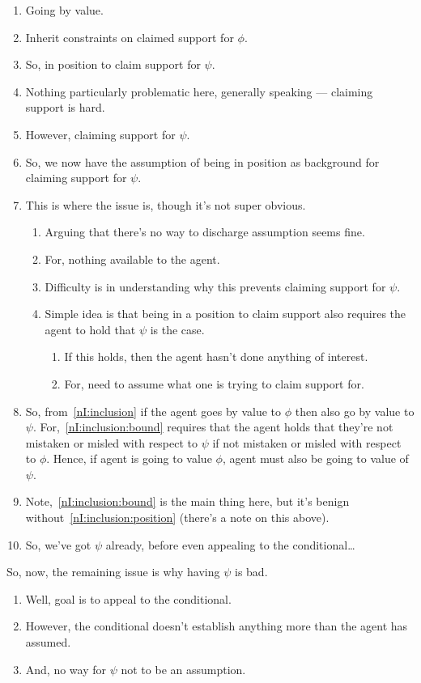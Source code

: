 \begin{note}[Revised]
  \begin{enumerate}
  \item Going by value.
  \item Inherit constraints on claimed support for \(\phi\).
  \item So, in position to claim support for \(\psi\).
  \item Nothing particularly problematic here, generally speaking --- claiming support is hard.
  \item However, claiming support for \(\psi\).
  \item So, we now have the assumption of being in position as background for claiming support for \(\psi\).
  \item This is where the issue is, though it's not super obvious.
    \begin{enumerate}
    \item Arguing that there's no way to discharge assumption seems fine.
    \item For, nothing available to the agent.
    \item Difficulty is in understanding why this prevents claiming support for \(\psi\).
    \item Simple idea is that being in a position to claim support also requires the agent to hold that \(\psi\) is the case.
      \begin{enumerate}
      \item If this holds, then the agent hasn't done anything of interest.
      \item For, need to assume what one is trying to claim support for.
      \end{enumerate}
    \end{enumerate}
  \item So, from~\ref{nI:inclusion} if the agent goes by value to \(\phi\) then also go by value to \(\psi\).
    For,~\ref{nI:inclusion:bound} requires that the agent holds that they're not mistaken or misled with respect to \(\psi\) if not mistaken or misled with respect to \(\phi\).
    Hence, if agent is going to value \(\phi\), agent must also be going to value of \(\psi\).
  \item Note,~\ref{nI:inclusion:bound} is the main thing here, but it's benign without~\ref{nI:inclusion:position} (there's a note on this above).
  \item So, we've got \(\psi\) already, before even appealing to the conditional\dots
  \end{enumerate}
  So, now, the remaining issue is why having \(\psi\) is bad.
  \begin{enumerate}
  \item Well, goal is to appeal to the conditional.
  \item However, the conditional doesn't establish anything more than the agent has assumed.
  \item And, no way for \(\psi\) not to be an assumption.
  \end{enumerate}
\end{note}

